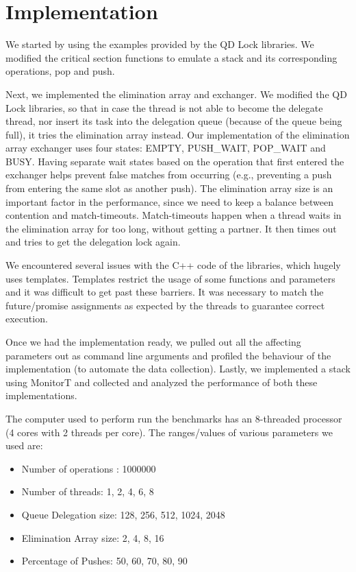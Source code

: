 \section{Implementation}
We started by using the examples provided by the QD Lock libraries. We modified the critical section functions to emulate a stack and its corresponding operations, pop and push. 

Next, we implemented the elimination array and exchanger. We modified the QD Lock libraries, so that in case the thread is not able to become the delegate thread, nor insert its task into the delegation queue (because of the queue being full), it tries the elimination array instead. Our implementation of the elimination array exchanger uses four states: EMPTY, PUSH\_WAIT, POP\_WAIT and BUSY. Having separate wait states based on the operation that first entered the exchanger helps prevent false matches from occurring (e.g., preventing a push from entering the same slot as another push). The elimination array size is an important factor in the performance, since we need to keep a balance between contention and match-timeouts. Match-timeouts happen when a thread waits in the elimination array for too long, without getting a partner. It then times out and tries to get the delegation lock again.

We encountered several issues with the C++ code of the libraries, which hugely uses templates. Templates restrict the usage of some functions and parameters and it was difficult to get past these barriers. It was necessary to match the future/promise assignments as expected by the threads to guarantee correct execution.

Once we had the implementation ready, we pulled out all the affecting parameters out as command line arguments and profiled the behaviour of the implementation (to automate the data collection). Lastly, we implemented a stack using MonitorT and collected and analyzed the performance of both these implementations.

The computer used to perform run the benchmarks has an 8-threaded processor (4 cores with 2 threads per core). The ranges/values of various parameters we used are:
\begin{itemize}
\item Number of operations : 1000000
\item Number of threads: 1, 2, 4, 6, 8
\item Queue Delegation size: 128, 256, 512, 1024, 2048
\item Elimination Array size: 2, 4, 8, 16
\item Percentage of Pushes: 50, 60, 70, 80, 90
\end{itemize}

